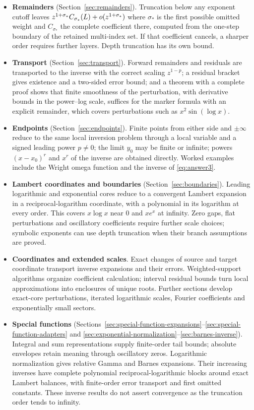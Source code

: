\begin{itemize}[leftmargin=1.6em]
\item \textbf{Remainders} (Section~\ref{sec:remainders}). Truncation below any exponent cutoff leaves $z^{1+\sigma_*}C_{\sigma_*}(L)+o(z^{1+\sigma_*})$ where $\sigma_*$ is the first possible omitted weight and $C_{\sigma_*}$ the complete coefficient there, computed from the one-step boundary of the retained multi-index set. If that coefficient cancels, a sharper order requires further layers. Depth truncation has its own bound.
\item \textbf{Transport} (Section~\ref{sec:transport}). Forward remainders and residuals are transported to the inverse with the correct scaling $z^{1-p}$; a residual bracket gives existence and a two-sided error bound; and a theorem with a complete proof shows that finite smoothness of the perturbation, with derivative bounds in the power--log scale, suffices for the marker formula with an explicit remainder, which covers perturbations such as $x^2\sin(\log x)$.
\item \textbf{Endpoints} (Section~\ref{sec:endpoints}). Finite points from either side and $\pm\infty$ reduce to the same local inversion problem through a local variable and a signed leading power $p\ne0$; the limit $y_0$ may be finite or infinite; powers $(x-x_0)^r$ and $x^r$ of the inverse are obtained directly. Worked examples include the Wright omega function and the inverse of \eqref{eq:answer3}.
\item \textbf{Lambert coordinates and boundaries} (Section~\ref{sec:boundaries}). Leading logarithmic and exponential cores reduce to a convergent Lambert expansion in a reciprocal-logarithm coordinate, with a polynomial in its logarithm at every order. This covers $x\log x$ near $0$ and $xe^x$ at infinity. Zero gaps, flat perturbations and oscillatory coefficients require further scale choices; symbolic exponents can use depth truncation when their branch assumptions are proved.
\item \textbf{Coordinates and extended scales}. Exact changes of source and target coordinate transport inverse expansions and their errors. Weighted-support algorithms organize coefficient calculation; interval residual bounds turn local approximations into enclosures of unique roots. Further sections develop exact-core perturbations, iterated logarithmic scales, Fourier coefficients and exponentially small sectors.
\item \textbf{Special functions} (Sections~\ref{sec:special-function-expansions}--\ref{sec:special-function-adapters} and \ref{sec:exponential-normalization}--\ref{sec:barnes-inverse}). Integral and sum representations supply finite-order tail bounds; absolute envelopes retain meaning through oscillatory zeros. Logarithmic normalization gives relative Gamma and Barnes expansions. Their increasing inverses have complete polynomial reciprocal-logarithmic blocks around exact Lambert balances, with finite-order error transport and first omitted constants. These inverse results do not assert convergence as the truncation order tends to infinity.
\end{itemize}

